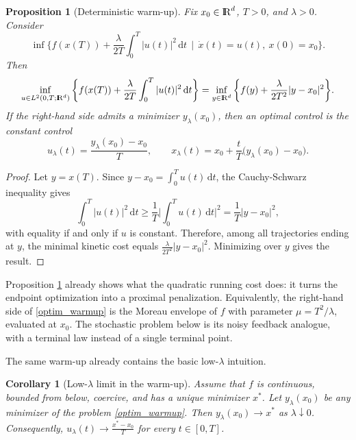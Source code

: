 \documentclass[11pt]{amsart}
\def\R{\mathrm{I\kern-0.21emR}}
\newcommand{\dd}{\,\mathrm{d}}
\renewcommand{\geq}{\geqslant}
\renewcommand{\Vert}{|}
\numberwithin{equation}{section}
\numberwithin{figure}{section}
\newtheorem{proposition}[theorem]{Proposition}%
\newtheorem{corollary}[theorem]{Corollary}%
\theoremstyle{definition}\newtheorem{remark}[theorem]{Remark}%
\begin{document}
\begin{proposition}[Deterministic warm-up]\label{warmup}
Fix $x_0 \in \R^d$, $T > 0$, and $\lambda > 0$. Consider
$$
\inf \bigg\{ f(x(T)) + \frac{\lambda}{2T}\int_0^T \Vert u(t) \Vert^2 \dd t \ \ \big\vert\ \ \dot x(t) = u(t),\ x(0) = x_0 \bigg\}.
$$
Then
\begin{equation}\label{optim_warmup}
\inf_{u \in L^2(0,T;\R^d)} \bigg\{ f(x(T)) + \frac{\lambda}{2T}\int_0^T \Vert u(t) \Vert^2 \dd t \bigg\}
= \inf_{y \in \R^d} \bigg\{ f(y) + \frac{\lambda}{2T^2}\Vert y - x_0 \Vert^2 \bigg\}.
\end{equation}
If the right-hand side admits a minimizer $y_\lambda(x_0)$, then an optimal control is the constant control
$$
u_\lambda(t) = \frac{y_\lambda(x_0) - x_0}{T},
\qquad
x_\lambda(t) = x_0 + \frac{t}{T}\big( y_\lambda(x_0) - x_0 \big).
$$
\end{proposition}

\begin{proof}
Let $y = x(T)$. Since $y - x_0 = \int_0^T u(t)\dd t$, the Cauchy-Schwarz inequality gives
$$
\int_0^T \Vert u(t) \Vert^2 \dd t \geq \frac{1}{T}\bigg\Vert \int_0^T u(t)\dd t \bigg\Vert^2 = \frac{1}{T}\Vert y - x_0 \Vert^2,
$$
with equality if and only if $u$ is constant. Therefore, among all trajectories ending at $y$, the minimal kinetic cost equals $\frac{\lambda}{2T^2}\Vert y - x_0 \Vert^2$. Minimizing over $y$ gives the result.
\end{proof}

Proposition \ref{warmup} already shows what the quadratic running cost does: it turns the endpoint optimization into a proximal penalization. Equivalently, the right-hand side of \eqref{optim_warmup} is the Moreau envelope of $f$ with parameter $\mu = T^2/\lambda$, evaluated at $x_0$. The stochastic problem below is its noisy feedback analogue, with a terminal law instead of a single terminal point.

The same warm-up already contains the basic low-$\lambda$ intuition.

\begin{corollary}[Low-$\lambda$ limit in the warm-up]\label{warmup_small_lambda}
Assume that $f$ is continuous, bounded from below, coercive, and has a unique minimizer $x^*$. Let $y_\lambda(x_0)$ be any minimizer of the problem \eqref{optim_warmup}. Then $y_\lambda(x_0) \to x^*$ as $\lambda \downarrow 0$. Consequently, $u_\lambda(t) \to \frac{x^* - x_0}{T}$ for every $t \in [0,T]$.
\end{corollary}
\end{document}
